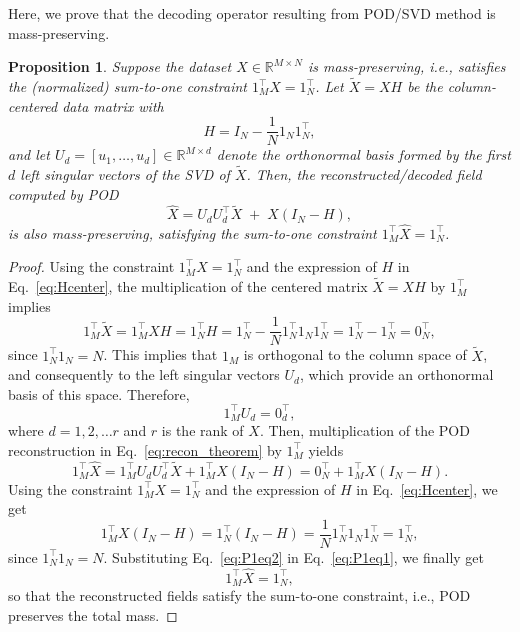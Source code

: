 \documentclass{article}
\newtheorem{prop}{Proposition}
\begin{document}
Here, we prove that the decoding operator resulting from POD/SVD method is mass-preserving.
\begin{prop} \label{prop:POD}
Suppose the dataset \(X \in \mathbb{R}^{M \times N}\) is mass-preserving, i.e., satisfies the (normalized) sum-to-one constraint $1_M^\top X = 1_N^\top$. Let $\tilde{X} = XH$ be the column-centered data matrix with
\begin{equation}
H = I_N - \frac{1}{N} 1_N 1_N^\top,
\label{eq:Hcenter}
\end{equation}
and let $U_d = [u_1,\ldots,u_d] \in \mathbb{R}^{M \times d}$ denote the orthonormal basis formed by the first $d$ left singular vectors of the SVD of $\tilde{X}$. Then, the reconstructed/decoded field computed by POD
\begin{equation}
\widehat{X} = U_d U_d^\top \tilde{X} \;+\; X (I_N - H),
\label{eq:recon_theorem}
\end{equation}
is also mass-preserving, satisfying the sum-to-one constraint
$1_M^\top \widehat{X} = 1_N^\top$.
\end{prop}
\begin{proof}
Using the constraint $1_M^\top X = 1_N^\top$ and the expression of $H$ in Eq.~\eqref{eq:Hcenter}, the multiplication of the centered matrix $\tilde{X} = X H$ by $1_M^\top$ implies
\begin{equation*}
1_M^\top \tilde{X} = 1^{\top}_M X H = 1_N^\top H = 1_N^\top - \frac{1}{N} 1_N^\top 1_N 1_N^\top = 1_N^\top - 1_N^\top = 0_N^\top,
\end{equation*}
since  $1_N^\top 1_N = N$. This implies that $1_{M}$ is orthogonal to the column space of $\tilde{X}$, and consequently to the left singular vectors $U_d$, which provide an orthonormal basis of this space. Therefore,
\begin{equation*}
1^{\top}_{M} U_d = 0^{\top}_d,
\end{equation*}
where $d=1,2,\dots r$ and $r$ is the rank of $X$. Then, multiplication of the POD reconstruction in Eq.~\eqref{eq:recon_theorem} by $1_{M}^\top$ yields
\begin{equation}
1_M^\top \widehat{X} = 1_M^\top U_d U_d^\top \tilde{X} + 1_M^\top X (I_N - H) = 0_N^\top + 1_M^\top X (I_N - H).
\label{eq:P1eq1}
\end{equation}
Using the constraint $1_M^\top X = 1_N^\top$ and the expression of $H$ in Eq.~\eqref{eq:Hcenter}, we get
\begin{equation}
1_M^\top X (I_N - H)  =  1_N^\top (I_N - H) =  \frac{1}{N} 1_N^\top 1_N 1_N^\top = 1_N^\top,
\label{eq:P1eq2}
\end{equation}
since  $1_N^\top 1_N = N$. Substituting Eq.~\eqref{eq:P1eq2} in Eq.~\eqref{eq:P1eq1}, we finally get  
\begin{equation*}
    1_M^\top \widehat{X} = 1_N^\top,
\end{equation*}
so that the reconstructed fields satisfy the sum-to-one constraint, i.e., POD preserves the total mass.
\end{proof}
\end{document}
